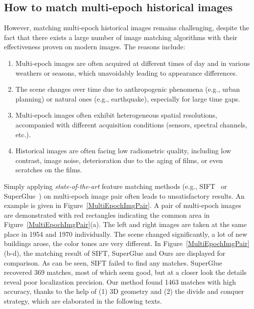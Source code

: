 \subsection{How to match multi-epoch historical images}
However, matching multi-epoch historical images remains challenging, despite the fact that there exists a large number of image matching algorithms with their effectiveness proven on modern images. The reasons include:
\begin{enumerate}
	\item Multi-epoch images are often acquired at different times of day and in various weathers or seasons, which unavoidably leading to appearance differences.
	\item The scene changes over time due to anthropogenic phenomena (e.g., urban planning) or natural ones (e.g., earthquake), especially for large time gaps.
	\item Multi-epoch images often exhibit heterogeneous spatial resolutions, accompanied with different acquisition conditions (sensors, spectral channels, etc.).
	\item Historical images are often facing low radiometric quality, including low contrast, image noise, deterioration due to the aging of films, or even scratches on the films.
\end{enumerate}
Simply applying \textit{state-of-the-art} feature matching methods (e.g., SIFT~\cite{lowe2004distinctive} or SuperGlue~\cite{sarlin2020superglue}) on multi-epoch image pair often leads to unsatisfactory results. An example is given in Figure~\ref{MultiEpochImgPair}. A pair of multi-epoch images are demonstrated with red rectangles indicating the common area in Figure~\ref{MultiEpochImgPair}(a). The left and right images are taken at the same place in 1954 and 1970 individually. The scene changed significantly, a lot of new buildings arose, the color tones are very different. In Figure~\ref{MultiEpochImgPair}(b-d), the matching result of SIFT, SuperGlue and Ours are displayed for comparison. As can be seen, SIFT failed to find any matches. SuperGlue recovered 369 matches, most of which seem good, but at a closer look the details reveal poor localization precision. Our method found 1463 matches with high accuracy, thanks to the help of (1) 3D geometry and (2) the divide and conquer strategy, which are elaborated in the following texts.
